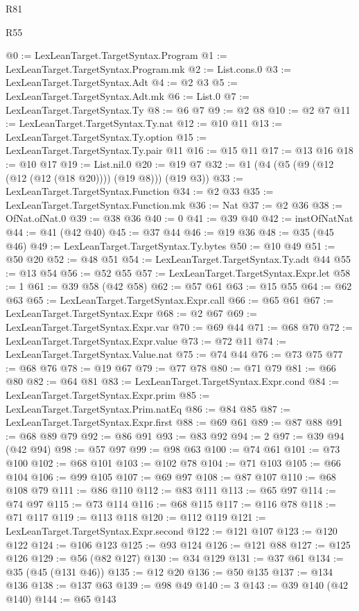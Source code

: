 \begin{lexlean}{R81}
\begin{lexlean}{R55}
\begin{coremodule}
{{{{{{{{{{{{{{{{{{{{{{{{{{{{{{{{{{{{{{{{{{{{{{{{{{{{{{{{{{{{@0 := LexLeanTarget.TargetSyntax.Program
@1 := LexLeanTarget.TargetSyntax.Program.mk
@2 := List.cons.{0}
@3 := LexLeanTarget.TargetSyntax.Adt
@4 := @2 @3
@5 := LexLeanTarget.TargetSyntax.Adt.mk
@6 := List.{0}
@7 := LexLeanTarget.TargetSyntax.Ty
@8 := @6 @7
@9 := @2 @8
@10 := @2 @7
@11 := LexLeanTarget.TargetSyntax.Ty.nat
@12 := @10 @11
@13 := LexLeanTarget.TargetSyntax.Ty.option
@15 := LexLeanTarget.TargetSyntax.Ty.pair @11
@16 := @15 @11
@17 := @13 @16
@18 := @10 @17
@19 := List.nil.{0}
@20 := @19 @7
@32 := @1 (@4 (@5 (@9 (@12 (@12 (@12 (@18 @20)))) (@19 @8))) (@19 @3))
@33 := LexLeanTarget.TargetSyntax.Function
@34 := @2 @33
@35 := LexLeanTarget.TargetSyntax.Function.mk
@36 := Nat
@37 := @2 @36
@38 := OfNat.ofNat.{0}
@39 := @38 @36
@40 := 0
@41 := @39 @40
@42 := instOfNatNat
@44 := @41 (@42 @40)
@45 := @37 @44
@46 := @19 @36
@48 := @35 (@45 @46)
@49 := LexLeanTarget.TargetSyntax.Ty.bytes
@50 := @10 @49
@51 := @50 @20
@52 := @48 @51
@54 := LexLeanTarget.TargetSyntax.Ty.adt @44
@55 := @13 @54
@56 := @52 @55
@57 := LexLeanTarget.TargetSyntax.Expr.let
@58 := 1
@61 := @39 @58 (@42 @58)
@62 := @57 @61
@63 := @15 @55
@64 := @62 @63
@65 := LexLeanTarget.TargetSyntax.Expr.call
@66 := @65 @61
@67 := LexLeanTarget.TargetSyntax.Expr
@68 := @2 @67
@69 := LexLeanTarget.TargetSyntax.Expr.var
@70 := @69 @44
@71 := @68 @70
@72 := LexLeanTarget.TargetSyntax.Expr.value
@73 := @72 @11
@74 := LexLeanTarget.TargetSyntax.Value.nat
@75 := @74 @44
@76 := @73 @75
@77 := @68 @76
@78 := @19 @67
@79 := @77 @78
@80 := @71 @79
@81 := @66 @80
@82 := @64 @81
@83 := LexLeanTarget.TargetSyntax.Expr.cond
@84 := LexLeanTarget.TargetSyntax.Expr.prim
@85 := LexLeanTarget.TargetSyntax.Prim.natEq
@86 := @84 @85
@87 := LexLeanTarget.TargetSyntax.Expr.first
@88 := @69 @61
@89 := @87 @88
@91 := @68 @89 @79
@92 := @86 @91
@93 := @83 @92
@94 := 2
@97 := @39 @94 (@42 @94)
@98 := @57 @97
@99 := @98 @63
@100 := @74 @61
@101 := @73 @100
@102 := @68 @101
@103 := @102 @78
@104 := @71 @103
@105 := @66 @104
@106 := @99 @105
@107 := @69 @97
@108 := @87 @107
@110 := @68 @108 @79
@111 := @86 @110
@112 := @83 @111
@113 := @65 @97
@114 := @74 @97
@115 := @73 @114
@116 := @68 @115
@117 := @116 @78
@118 := @71 @117
@119 := @113 @118
@120 := @112 @119
@121 := LexLeanTarget.TargetSyntax.Expr.second
@122 := @121 @107
@123 := @120 @122
@124 := @106 @123
@125 := @93 @124
@126 := @121 @88
@127 := @125 @126
@129 := @56 (@82 @127)
@130 := @34 @129
@131 := @37 @61
@134 := @35 (@45 (@131 @46))
@135 := @12 @20
@136 := @50 @135
@137 := @134 @136
@138 := @137 @63
@139 := @98 @49
@140 := 3
@143 := @39 @140 (@42 @140)
@144 := @65 @143
}}}}}}}}}}}}}}}}}}}}}}}}}}}}}}}}}}}}}}}}}}}}}}}}}}}}}}}}}}}}
\end{coremodule}
\end{lexlean}
\end{lexlean}
